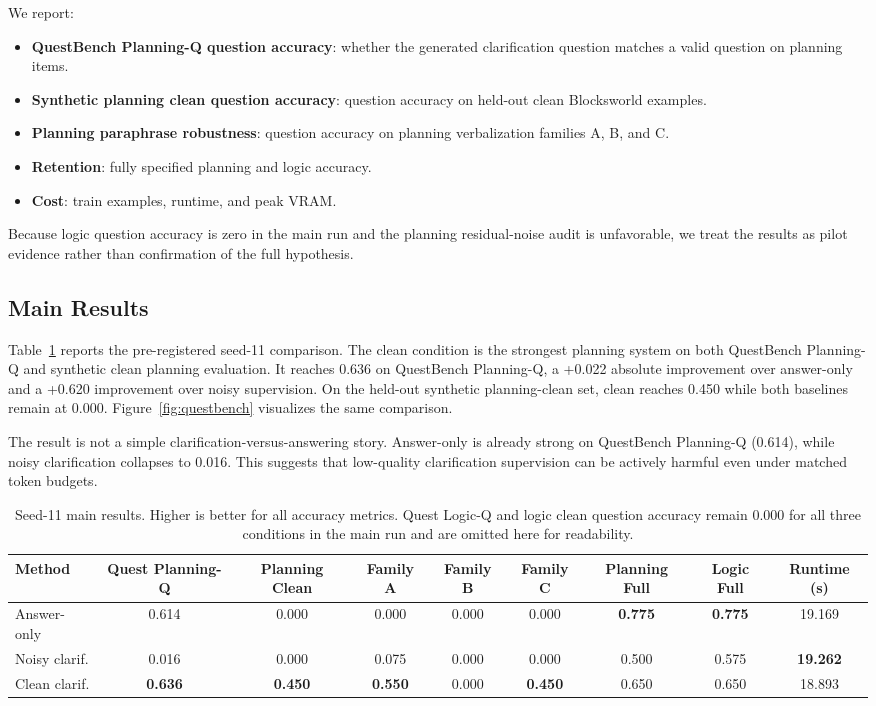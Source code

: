 We report:
\begin{itemize}[leftmargin=*]
  \item \textbf{QuestBench Planning-Q question accuracy}: whether the generated clarification question matches a valid question on planning items.
  \item \textbf{Synthetic planning clean question accuracy}: question accuracy on held-out clean Blocksworld examples.
  \item \textbf{Planning paraphrase robustness}: question accuracy on planning verbalization families A, B, and C.
  \item \textbf{Retention}: fully specified planning and logic accuracy.
  \item \textbf{Cost}: train examples, runtime, and peak VRAM.
\end{itemize}

Because logic question accuracy is zero in the main run and the planning residual-noise audit is unfavorable, we treat the results as pilot evidence rather than confirmation of the full hypothesis.

\subsection{Main Results}
Table~\ref{tab:main} reports the pre-registered seed-11 comparison. The clean condition is the strongest planning system on both QuestBench Planning-Q and synthetic clean planning evaluation. It reaches 0.636 on QuestBench Planning-Q, a +0.022 absolute improvement over answer-only and a +0.620 improvement over noisy supervision. On the held-out synthetic planning-clean set, clean reaches 0.450 while both baselines remain at 0.000. Figure~\ref{fig:questbench} visualizes the same comparison.

The result is not a simple clarification-versus-answering story. Answer-only is already strong on QuestBench Planning-Q (0.614), while noisy clarification collapses to 0.016. This suggests that low-quality clarification supervision can be actively harmful even under matched token budgets.

\begin{table}[t]
\caption{Seed-11 main results. Higher is better for all accuracy metrics. Quest Logic-Q and logic clean question accuracy remain 0.000 for all three conditions in the main run and are omitted here for readability.}
\label{tab:main}
\centering
\small
\begin{tabular}{lcccccccc}
\toprule
Method & Quest Planning-Q & Planning Clean & Family A & Family B & Family C & Planning Full & Logic Full & Runtime (s) \\
\midrule
Answer-only & 0.614 & 0.000 & 0.000 & 0.000 & 0.000 & \textbf{0.775} & \textbf{0.775} & 19.169 \\
Noisy clarif. & 0.016 & 0.000 & 0.075 & 0.000 & 0.000 & 0.500 & 0.575 & \textbf{19.262} \\
Clean clarif. & \textbf{0.636} & \textbf{0.450} & \textbf{0.550} & 0.000 & \textbf{0.450} & 0.650 & 0.650 & 18.893 \\
\bottomrule
\end{tabular}
\end{table}

